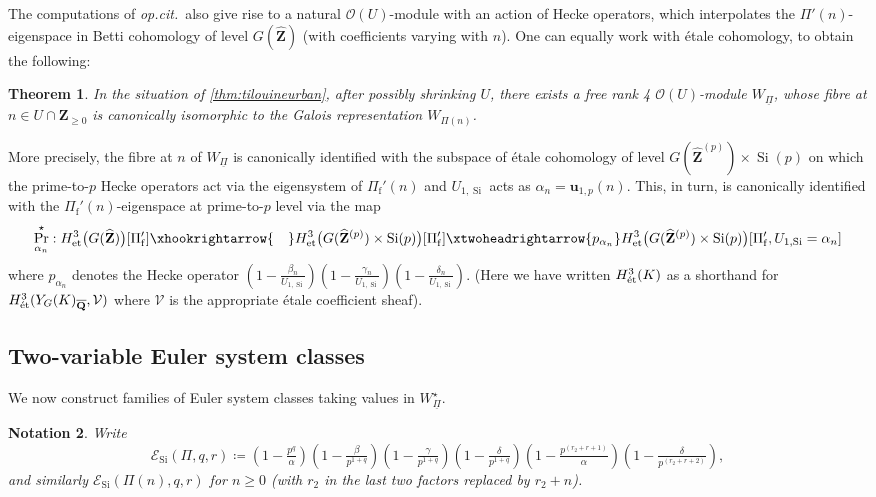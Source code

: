\documentclass[cjm]{ipart}
\theoremstyle{plain}
\newtheorem{theorem}{Theorem}[subsection]
\newtheorem{notation}[theorem]{Notation}
\theoremstyle{remark}
\DeclareMathOperator{\id}{id}
\DeclareMathOperator{\Sieg}{Si}
\newcommand{\Pif}{\Pi_{\mathrm{f}}}
\newcommand{\QQbar}{\overline{\QQ}}
\newcommand{\QQ}{\mathbf{Q}}
\newcommand{\ZZ}{\mathbf{Z}}
\newcommand{\cE}{\mathcal{E}}
\newcommand{\cO}{\mathcal{O}}
\newcommand{\cV}{\mathcal{V}}
\newcommand{\et}{\text{\textup{\'et}}}
\newcommand{\uPi}{\underline{\Pi}}
\newcommand{\uchi}{\underline{\chi}}
\numberwithin{equation}{subsection}
\renewcommand{\ge}{\geqslant}
\begin{document}
  The computations of \emph{op.cit.}~also give rise to a natural $\cO(U)$-module with an action of Hecke operators, which interpolates the $\Pi'(n)$-eigenspace in Betti cohomology of level $G(\widehat{\ZZ})$ (with coefficients varying with $n$). One can equally work with \'etale cohomology, to obtain the following:

  \begin{theorem}
   In the situation of \cref{thm:tilouineurban}, after possibly shrinking $U$, there exists a free rank 4 $\cO(U)$-module $W_{\uPi}$, whose fibre at $n \in U \cap \ZZ_{\ge 0}$ is canonically isomorphic to the Galois representation $W_{\Pi(n)}$.
  \end{theorem}

  \begin{note}
   More precisely, the fibre at $n$ of $W_{\uPi}$ is canonically identified with the subspace of \'etale cohomology of level $G(\widehat{\ZZ}^{(p)}) \times \Sieg(p)$ on which the prime-to-$p$ Hecke operators act via the eigensystem of $\Pif'(n)$ and $U_{1, \Sieg}$ acts as $\alpha_n = \mathbf{u}_{1, p}(n)$. This, in turn, is canonically identified with the $\Pif'(n)$-eigenspace at prime-to-$p$ level via the map
   \[\Pr_{\alpha_n}^{\star}: H^3_{\mathrm{et}}\big(G(\widehat{\ZZ})\big)[\Pif']
   \xhookrightarrow{\ \ \ } H^3_{\mathrm{et}}\big(G(\widehat{\ZZ}^{(p)}) \times \Sieg(p)\big)[\Pif'] \xtwoheadrightarrow{p_{\alpha_n}} H^3_{\mathrm{et}}\big(G(\widehat{\ZZ}^{(p)}) \times \Sieg(p)\big)[\Pif', U_{1,\Sieg} = \alpha_n]
   \]
   where $p_{\alpha_n}$ denotes the Hecke operator $(1 - \frac{\beta_n}{U_{1, \Sieg}})(1 - \frac{\gamma_n}{U_{1, \Sieg}})(1 - \frac{\delta_n}{U_{1, \Sieg}})$.
   (Here we have written $H^3_{\et}(K)$ as a shorthand for $H^3_{\et}(Y_G(K)_{\QQbar}, \cV)$ where $\cV$ is the appropriate \'etale coefficient sheaf).
  \end{note}

 \subsection{Two-variable Euler system classes}
  \label{sect:twovarES}
  We now construct families of Euler system classes taking values in $W_{\uPi}^\star$. %
  \begin{notation}
   Write
   \[
    \cE_{\Sieg}(\Pi, q, r) \coloneqq  \left(1 - \tfrac{p^q}{\alpha}\right)\left(1 - \tfrac{\beta}{p^{1+q}}\right)\left(1 - \tfrac{\gamma}{p^{1 + q}}\right)\left(1 - \tfrac{\delta}{p^{1 + q}}\right) \left(1 - \tfrac{p^{(r_2 + r + 1)} }{\alpha}\right)\left(1 - \tfrac{\delta}{ p^{(r_2 + r + 2)}}\right),
   \]
   and similarly $\cE_{\Sieg}(\Pi(n), q, r)$ for $n \ge 0$ (with $r_2$ in the last two factors replaced by $r_2 + n$).
  \end{notation}
\end{document}
